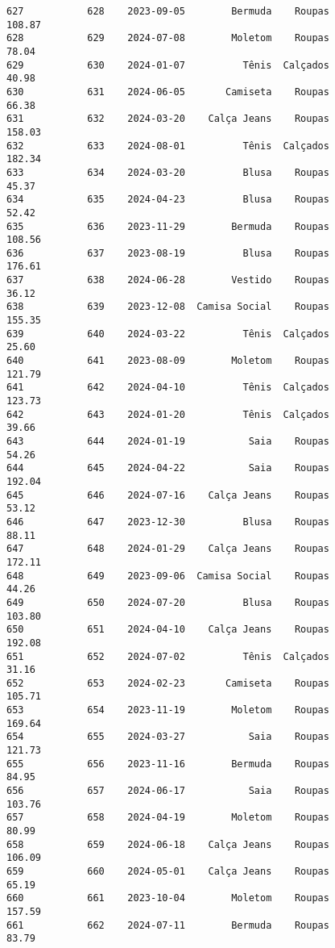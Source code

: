 \documentclass[11pt]{article}
\begin{document}
\begin{Verbatim}[commandchars=\\\{\}]
627           628    2023-09-05        Bermuda    Roupas          108.87   
628           629    2024-07-08        Moletom    Roupas           78.04   
629           630    2024-01-07          Tênis  Calçados           40.98   
630           631    2024-06-05       Camiseta    Roupas           66.38   
631           632    2024-03-20    Calça Jeans    Roupas          158.03   
632           633    2024-08-01          Tênis  Calçados          182.34   
633           634    2024-03-20          Blusa    Roupas           45.37   
634           635    2024-04-23          Blusa    Roupas           52.42   
635           636    2023-11-29        Bermuda    Roupas          108.56   
636           637    2023-08-19          Blusa    Roupas          176.61   
637           638    2024-06-28        Vestido    Roupas           36.12   
638           639    2023-12-08  Camisa Social    Roupas          155.35   
639           640    2024-03-22          Tênis  Calçados           25.60   
640           641    2023-08-09        Moletom    Roupas          121.79   
641           642    2024-04-10          Tênis  Calçados          123.73   
642           643    2024-01-20          Tênis  Calçados           39.66   
643           644    2024-01-19           Saia    Roupas           54.26   
644           645    2024-04-22           Saia    Roupas          192.04   
645           646    2024-07-16    Calça Jeans    Roupas           53.12   
646           647    2023-12-30          Blusa    Roupas           88.11   
647           648    2024-01-29    Calça Jeans    Roupas          172.11   
648           649    2023-09-06  Camisa Social    Roupas           44.26   
649           650    2024-07-20          Blusa    Roupas          103.80   
650           651    2024-04-10    Calça Jeans    Roupas          192.08   
651           652    2024-07-02          Tênis  Calçados           31.16   
652           653    2024-02-23       Camiseta    Roupas          105.71   
653           654    2023-11-19        Moletom    Roupas          169.64   
654           655    2024-03-27           Saia    Roupas          121.73   
655           656    2023-11-16        Bermuda    Roupas           84.95   
656           657    2024-06-17           Saia    Roupas          103.76   
657           658    2024-04-19        Moletom    Roupas           80.99   
658           659    2024-06-18    Calça Jeans    Roupas          106.09   
659           660    2024-05-01    Calça Jeans    Roupas           65.19   
660           661    2023-10-04        Moletom    Roupas          157.59   
661           662    2024-07-11        Bermuda    Roupas           83.79   

\end{Verbatim}
\end{document}
